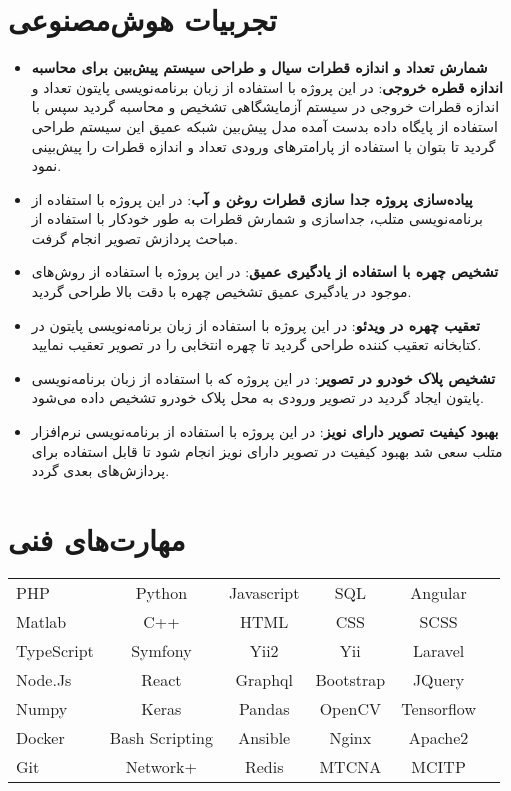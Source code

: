 \documentclass[letterpaper,12pt]{article}
\newcommand{\resumeSubHeadingListStart}{\begin{itemize}[leftmargin=*]}
\newcommand{\resumeSubHeadingListEnd}{\end{itemize}}
\begin{document}
\section{تجربیات هوش‌مصنوعی}\bigskip
\resumeSubHeadingListStart
\item{
	\textbf{شمارش تعداد و اندازه قطرات سیال و طراحی سیستم پیش‌بین برای  محاسبه اندازه قطره خروجی}{: در این پروژه با استفاده از زبان برنامه‌نویسی پایتون تعداد  و اندازه قطرات خروجی در سیستم آزمایشگاهی تشخیص و محاسبه گردید سپس با استفاده از پایگاه داده بدست آمده مدل پیش‌بین شبکه عمیق این سیستم طراحی گردید تا بتوان با استفاده از پارامترهای ورودی تعداد و اندازه قطرات را پیش‌بینی نمود.}
	\hfill
}
\item{
	\textbf{پیاده‌سازی پروژه جدا سازی قطرات  روغن و آب}{: در این پروژه با استفاده از برنامه‌نویسی متلب، جداسازی و شمارش قطرات به طور خودکار با استفاده از مباحث پردازش تصویر انجام گرفت.}
	\hfill
}
\item{
	\textbf{تشخیص چهره با استفاده از یادگیری عمیق}{: در این پروژه با استفاده از روش‌های موجود در یادگیری عمیق تشخیص چهره با دقت بالا طراحی گردید.}
}
\item{
	\textbf{تعقیب چهره در ویدئو}{: در این پروژه با استفاده از زبان برنامه‌نویسی پایتون در کتابخانه  تعقیب کننده طراحی گردید تا چهره انتخابی را در تصویر تعقیب نمایید.}
}
\item{
	\textbf{تشخیص پلاک خودرو در تصویر}{: در این پروژه که با استفاده از زبان برنامه‌نویسی پایتون ایجاد گردید در تصویر ورودی به محل پلاک خودرو تشخیص داده می‌شود.}
}
\item{
	\textbf{بهبود کیفیت تصویر دارای نویز}{: در این پروژه با استفاده از برنامه‌نویسی نرم‌افزار متلب سعی شد بهبود کیفیت در تصویر دارای نویز انجام شود تا قابل استفاده برای پردازش‌های بعدی گردد.}
}
\resumeSubHeadingListEnd

%
\section{مهارت‌های فنی}\bigskip
      \begin{latin}
      		\begin{tabular*}{\linewidth}{@{\extracolsep{\fill}}lccccr}\bigskip
      			PHP & Python & Javascript & SQL & Angular & \\ \bigskip
      			Matlab & C++ & HTML & CSS & SCSS &  \\ \bigskip
      			TypeScript & Symfony  & Yii2 & Yii & Laravel  & \\ \bigskip
      			Node.Js & React & Graphql &  Bootstrap & JQuery & \\ \bigskip
      			Numpy & Keras & Pandas & OpenCV & Tensorflow & \\ \bigskip
      			Docker & Bash Scripting & Ansible & Nginx & Apache2 & \\ \bigskip
      			Git & Network+ & Redis & MTCNA & MCITP & 
      		\end{tabular*}%
  \end{latin}
\end{document}
